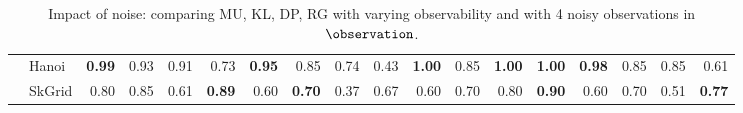 \begin{table*}[tb]
\begin{tabular}{cl|r|r|r|r|r|r|r|r|r|r|r|r|r|r|r|r|}
        \multicolumn{1}{|c|}{}                     & Hanoi                 & \textbf{0.99}                & 0.93                        & 0.91                    & 0.73                      & \textbf{0.95}                & 0.85                        & 0.74                    & 0.43                      & \textbf{1.00}                & 0.85                        & \textbf{1.00}           & \textbf{1.00}             & \textbf{0.98}                & 0.85                        & 0.85                    & 0.61                      \\ \cline{2-18} 
        \multicolumn{1}{|c|}{}                     & SkGrid                & 0.80                         & 0.85                        & 0.61                    & \textbf{0.89}             & 0.60                         & \textbf{0.70}               & 0.37                    & 0.67                      & 0.60                         & 0.70                        & 0.80                    & \textbf{0.90}             & 0.60                         & 0.70                        & 0.51                    & \textbf{0.77}             \\ \hline
        \end{tabular}
         \caption{Impact of noise: comparing MU, KL, DP, RG  with varying observability and with 4 noisy observations in $\observation$.}
         \label{tab:noisy_observations}
        \end{table*}